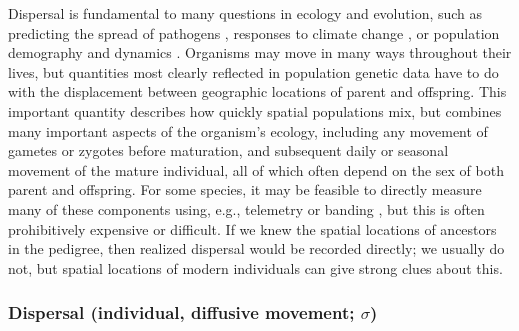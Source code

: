 \documentclass{ar-1col}
\begin{document}
Dispersal is fundamental to many questions in ecology and evolution,
such as
predicting the spread of pathogens \citep{BiekReal2010},
responses to climate change \citep{parmesan2006},
or population demography and dynamics \citep{schreiber2010interactive}.
Organisms may move in many ways throughout their lives,
but quantities most clearly reflected in population genetic data
have to do with the displacement between geographic locations of parent and offspring.
This important quantity describes how quickly spatial populations mix,
but combines many important aspects of the organism's ecology, including
any movement of gametes or zygotes before maturation,
and subsequent daily or seasonal movement of the mature individual,
all of which often depend on the sex of both parent and offspring.
For some species,
it may be feasible to directly measure many of these components
using, e.g., telemetry or banding \citep{Cayuela2018demographic},
but this is often prohibitively expensive or difficult.
If we knew the spatial locations of ancestors in the pedigree,
then realized dispersal would be recorded directly;
we usually do not, but spatial locations of modern individuals
can give strong clues about this.


\subsubsection{Dispersal (individual, diffusive movement; $\sigma$)}
\end{document}
